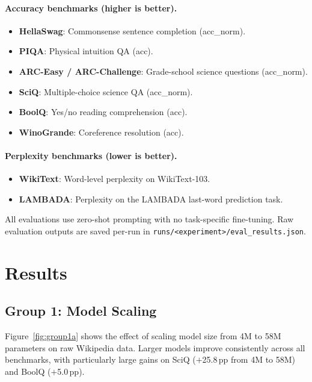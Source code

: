 \paragraph{Accuracy benchmarks (higher is better).}
\begin{itemize}
    \item \textbf{HellaSwag}: Commonsense sentence completion (acc\_norm).
    \item \textbf{PIQA}: Physical intuition QA (acc).
    \item \textbf{ARC-Easy / ARC-Challenge}: Grade-school science
          questions (acc\_norm).
    \item \textbf{SciQ}: Multiple-choice science QA (acc\_norm).
    \item \textbf{BoolQ}: Yes/no reading comprehension (acc).
    \item \textbf{WinoGrande}: Coreference resolution (acc).
\end{itemize}

\paragraph{Perplexity benchmarks (lower is better).}
\begin{itemize}
    \item \textbf{WikiText}: Word-level perplexity on WikiText-103.
    \item \textbf{LAMBADA}: Perplexity on the LAMBADA last-word
          prediction task.
\end{itemize}

All evaluations use zero-shot prompting with no task-specific fine-tuning.
Raw evaluation outputs are saved per-run in
\texttt{runs/<experiment>/eval\_results.json}.


\section{Results}
\label{sec:results}

\subsection{Group 1: Model Scaling}

Figure~\ref{fig:group1a} shows the effect of scaling model size from 4M to
58M parameters on raw Wikipedia data.  Larger models improve consistently
across all benchmarks, with particularly large gains on SciQ
($+$25.8\,pp from 4M to 58M) and BoolQ ($+$5.0\,pp).

